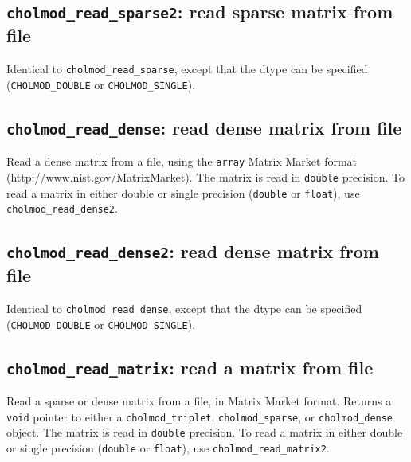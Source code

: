 \documentclass[11pt]{article}
\begin{document}
\subsection{{\tt cholmod\_read\_sparse2}: read sparse matrix from file}


Identical to \verb'cholmod_read_sparse', except that the dtype can be
specified (\verb'CHOLMOD_DOUBLE' or \verb'CHOLMOD_SINGLE').

\subsection{{\tt cholmod\_read\_dense}: read dense matrix from file}


Read a dense matrix from a file, using the {\tt array} Matrix Market format
\newline (http://www.nist.gov/MatrixMarket).
%
The matrix is read in {\tt double} precision.  To read a matrix
in either double or single precision ({\tt double} or {\tt float}),
use \verb'cholmod_read_dense2'.

\subsection{{\tt cholmod\_read\_dense2}: read dense matrix from file}


Identical to \verb'cholmod_read_dense', except that the dtype can be
specified (\verb'CHOLMOD_DOUBLE' or \verb'CHOLMOD_SINGLE').

\subsection{{\tt cholmod\_read\_matrix}: read a matrix from file}


Read a sparse or dense matrix from a file, in Matrix Market format.  Returns a
{\tt void} pointer to either a {\tt cholmod\_triplet}, {\tt cholmod\_sparse},
or {\tt cholmod\_dense} object.
%
The matrix is read in {\tt double} precision.  To read a matrix
in either double or single precision ({\tt double} or {\tt float}),
use \verb'cholmod_read_matrix2'.
\end{document}
